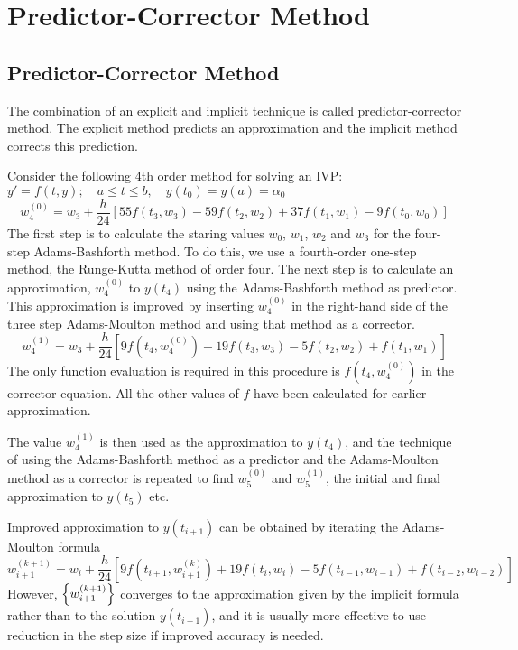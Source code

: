 \documentclass[../main-sheet.tex]{subfiles}
\begin{document}
\chapter{Predictor-Corrector Method}
\section{Predictor-Corrector Method}
The combination of an explicit and implicit technique is called predictor-corrector method. The explicit method predicts an approximation and the implicit method corrects this prediction.

Consider the following 4th order method for solving an IVP:
\(y'=f(t,y);\quad a\leq t\leq b,\quad y(t_0)=y(a)=\alpha_0\)
\[w_{4}^{(0)}=w_3+\frac{h}{24}\left[ 55f(t_3,w_3)-59f(t_{2},w_{2})+37f(t_{1},w_{1})-9f(t_{0},w_{0}) \right]\]
The first step is to calculate the staring values \(w_0\), \(w_1\), \(w_2\) and \(w_3\) for the four-step Adams-Bashforth method. To do this, we use a fourth-order one-step method, the Runge-Kutta method of order four. The next step is to calculate an approximation, \(w_4^{(0)}\) to \(y(t_4)\) using the Adams-Bashforth method as predictor. This approximation is improved by inserting \(w_4^{(0)}\) in the right-hand side of the three step Adams-Moulton method and using that method as a corrector.
\[w_{4}^{(1)}=w_3+\frac{h}{24}\left[ 9f(t_{4},w_{4}^{(0)})+19f(t_{3},w_{3})-5f(t_{2},w_{2})+f(t_{1},w_{1}) \right]\]
The only function evaluation is required in this procedure is \(f(t_4,w_4^{(0)})\) in the corrector equation. All the other values of \(f\) have been calculated for earlier approximation.


The value \(w_4^{(1)}\) is then used as the approximation to \(y(t_4)\), and the technique of using the Adams-Bashforth method as a predictor and the Adams-Moulton method as a corrector is repeated to find \(w_5^{(0)}\) and \(w_5^{(1)}\), the initial and final approximation to \(y(t_5)\) etc.

Improved approximation to \(y(t_{i+1})\) can be obtained by iterating the Adams-Moulton formula
\[
    w_{i+1}^{(k+1)}=w_i+\frac{h}{24}\left[ 9f(t_{i+1},w_{i+1}^{(k)})+19f(t_{i},w_{i})-5f(t_{i-1},w_{i-1})+f(t_{i-2},w_{i-2}) \right]
\]
However, \(\left\{w_{i+1}^{(k+1)}\right\}\) converges to the approximation given by the implicit formula rather than to the solution \(y(t_{i+1})\), and it is usually more effective to use reduction in the step size if improved accuracy is needed.
\end{document}
